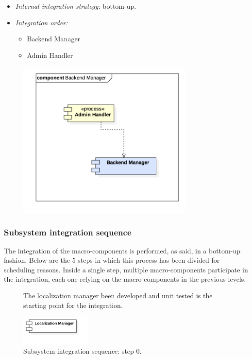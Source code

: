 			\begin{itemize}[label={},leftmargin=*,noitemsep,topsep=0pt]
				\item \textit{Internal integration strategy:} bottom-up.
				\item \textit{Integration order:}
					\begin{itemize}[noitemsep]
						\item Backend Manager
						\item Admin Handler
					\end{itemize}
			\end{itemize}
			\begin{figure}[h]
				\includegraphics[width=250pt, center]{img/integration_strategy/subcomponents/backend_manager.png}
			\end{figure}
		\FloatBarrier

	\subsubsection{Subsystem integration sequence}
	\label{sec:subsystem_integration_sequence}
		The integration of the macro-components is performed, as said, in a bottom-up fashion. Below are the 5 steps in which this process has been divided for scheduling reasons. Inside a single step, multiple macro-components participate in the integration, each one relying on the macro-components in the previous levels.

		\begin{figure}[h]
			The localization manager been developed and unit tested is the starting point for the integration.
			\par\bigskip
			\includegraphics[width=100pt,center]{img/integration_strategy/steps/high_level_components_lv0.png}
			\caption{Subsystem integration sequence: step 0.}
		\end{figure}
		\FloatBarrier

